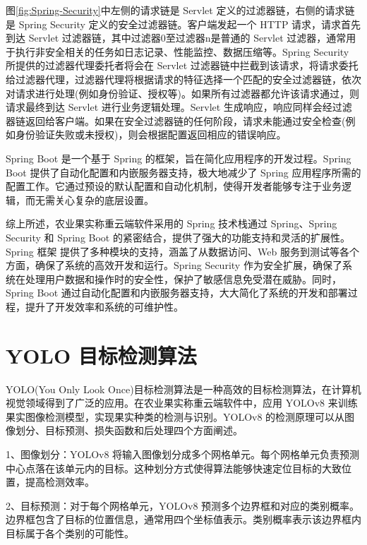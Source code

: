 图\ref{fig:Spring-Security}中左侧的请求链是 Servlet 定义的过滤器链，右侧的请求链是 Spring Security 定义的安全过滤器链。客户端发起一个 HTTP 请求，请求首先到达 Servlet 过滤器链，其中过滤器0至过滤器n是普通的 Servlet 过滤器，通常用于执行非安全相关的任务如日志记录、性能监控、数据压缩等。Spring Security 所提供的过滤器代理委托者将会在 Servlet 过滤器链中拦截到该请求，将请求委托给过滤器代理，过滤器代理将根据请求的特征选择一个匹配的安全过滤器链，依次对请求进行处理(例如身份验证、授权等)。如果所有过滤器都允许该请求通过，则请求最终到达 Servlet 进行业务逻辑处理。Servlet 生成响应，响应同样会经过滤器链返回给客户端。如果在安全过滤器链的任何阶段，请求未能通过安全检查(例如身份验证失败或未授权)，则会根据配置返回相应的错误响应\cite{Spring-Security-架构设计}。

Spring Boot 是一个基于 Spring 的框架，旨在简化应用程序的开发过程。Spring Boot 提供了自动化配置和内嵌服务器支持，极大地减少了 Spring 应用程序所需的配置工作。它通过预设的默认配置和自动化机制，使得开发者能够专注于业务逻辑，而无需关心复杂的底层设置\cite{Spring-Boot-概述}。

综上所述，农业果实称重云端软件采用的 Spring 技术栈通过 Spring、Spring Security 和 Spring Boot 的紧密结合，提供了强大的功能支持和灵活的扩展性。Spring 框架 提供了多种模块的支持，涵盖了从数据访问、Web 服务到测试等各个方面，确保了系统的高效开发和运行。Spring Security 作为安全扩展，确保了系统在处理用户数据和操作时的安全性，保护了敏感信息免受潜在威胁。同时，Spring Boot 通过自动化配置和内嵌服务器支持，大大简化了系统的开发和部署过程，提升了开发效率和系统的可维护性。

\section{YOLO 目标检测算法}\label{sec:yolo}

YOLO(You Only Look Once)目标检测算法是一种高效的目标检测算法，在计算机视觉领域得到了广泛的应用\cite{Lin2019}。在农业果实称重云端软件中，应用 YOLOv8 来训练果实图像检测模型，实现果实种类的检测与识别。YOLOv8 的检测原理可以从图像划分、目标预测、损失函数和后处理四个方面阐述。

1、图像划分：YOLOv8 将输入图像划分成多个网格单元。每个网格单元负责预测中心点落在该单元内的目标。这种划分方式使得算法能够快速定位目标的大致位置，提高检测效率\cite{Liu2023-yolov8}。

2、目标预测：对于每个网格单元，YOLOv8 预测多个边界框和对应的类别概率。边界框包含了目标的位置信息，通常用四个坐标值表示。类别概率表示该边界框内目标属于各个类别的可能性\cite{Liu2023-yolov8}。

